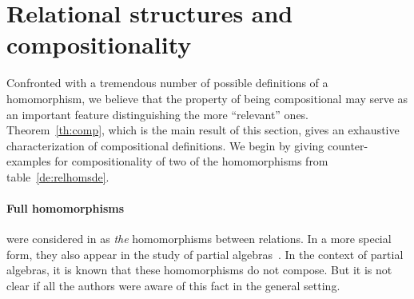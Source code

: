 \documentclass[10pt]{article}
\begin{document}
\section{Relational structures and compositionality}
\label{se:comp}



Confronted with a tremendous number of possible definitions of a
homomorphism, we believe that the property of being compositional may
serve as an important feature distinguishing the more ``relevant''
ones. Theorem~\ref{th:comp}, which is the main result of this section, 
gives an exhaustive characterization of
compositional definitions.  We
begin by giving counter-examples for compositionality of two of the
homomorphisms from table~\ref{de:relhomsde}. 
%
\paragraph{Full homomorphisms}
were considered in \cite{Most,Los:relhoms} as {\em
the} homomorphisms between relations. In a more special form, they also appear 
in the study of partial algebras~\cite{Burmeister}. In the context of partial algebras,
 it is known that these homomorphisms do not compose. But it is not clear if all the
authors were aware of this fact in the general setting. 

\end{document}
